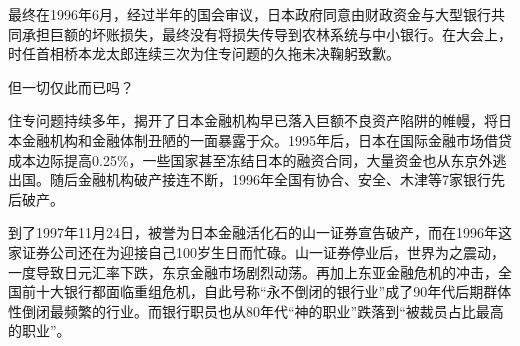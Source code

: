 {\fangsong 最终在1996年6月，经过半年的国会审议，日本政府同意由财政资金与大型银行共同承担巨额的坏账损失，最终没有将损失传导到农林系统与中小银行。在大会上，时任首相桥本龙太郎连续三次为住专问题的久拖未决鞠躬致歉。\par}

{\fangsong 但一切仅此而已吗？\par}

{\fangsong 住专问题持续多年，揭开了日本金融机构早已落入巨额不良资产陷阱的帷幔，将日本金融机构和金融体制丑陋的一面暴露于众。1995年后，日本在国际金融市场借贷成本边际提高0.25\%，一些国家甚至冻结日本的融资合同，大量资金也从东京外逃出国。随后金融机构破产接连不断，1996年全国有协合、安全、木津等7家银行先后破产。\par}

{\fangsong 到了1997年11月24日，被誉为日本金融活化石的山一证券宣告破产，而在1996年这家证券公司还在为迎接自己100岁生日而忙碌。山一证券停业后，世界为之震动，一度导致日元汇率下跌，东京金融市场剧烈动荡。再加上东亚金融危机的冲击，全国前十大银行都面临重组危机，自此号称“永不倒闭的银行业”成了90年代后期群体性倒闭最频繁的行业。而银行职员也从80年代“神的职业”跌落到“被裁员占比最高的职业”。\par}


